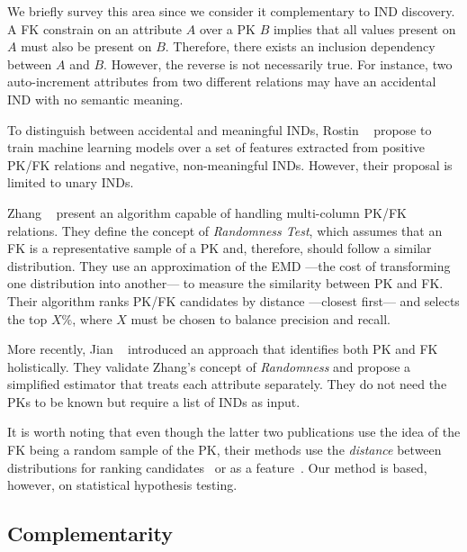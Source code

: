 We briefly survey this area since we consider it complementary to
\gls{IND} discovery. A \gls{FK} constrain on an attribute
$A$ over a \gls{PK} $B$ implies that all values present on $A$ must also be
present on $B$.
Therefore, there exists an inclusion dependency between $A$ and $B$.
However, the reverse is not necessarily true. For instance, two auto-increment attributes from
two different relations may have an accidental \gls{IND} with no semantic meaning.

To distinguish between accidental and meaningful \glspl{IND}, Rostin \etal~\cite{Rostin2009} propose to
train machine learning models over a set of features extracted from positive
\gls{PK}/\gls{FK} relations and negative, non-meaningful \glspl{IND}. However, their proposal
is limited to unary \glspl{IND}.

Zhang \etal~\cite{Zhang2010} present an algorithm capable of handling multi-column
\gls{PK}/\gls{FK} relations.
They define the concept of \emph{Randomness Test}, which assumes that an \gls{FK} is a representative
sample of a \gls{PK} and, therefore, should follow a similar distribution.
They use an approximation of the \gls{EMD} ---the cost of transforming one distribution into another---
to measure the similarity between \gls{PK} and \gls{FK}.
Their algorithm ranks \gls{PK}/\gls{FK} candidates by distance ---closest first--- and selects
the top $X\%$, where $X$ must be chosen to balance precision and recall.

More recently, Jian \etal~\cite{jiang_holistic_2020} introduced an approach that identifies
both \gls{PK} and \gls{FK} holistically. They validate Zhang's concept of \emph{Randomness}
and propose a simplified estimator that treats each attribute separately. They do not need
the \glspl{PK} to be known but require a list of \glspl{IND} as input.

It is worth noting that even though the latter two publications use the idea of the
\gls{FK} being a random sample of the \gls{PK}, their methods use the \emph{distance} between
distributions for ranking candidates~\cite{Zhang2010} or as a feature~\cite{jiang_holistic_2020}.
Our method is based, however, on statistical hypothesis testing\footnotemark.


\subsection{Complementarity}


